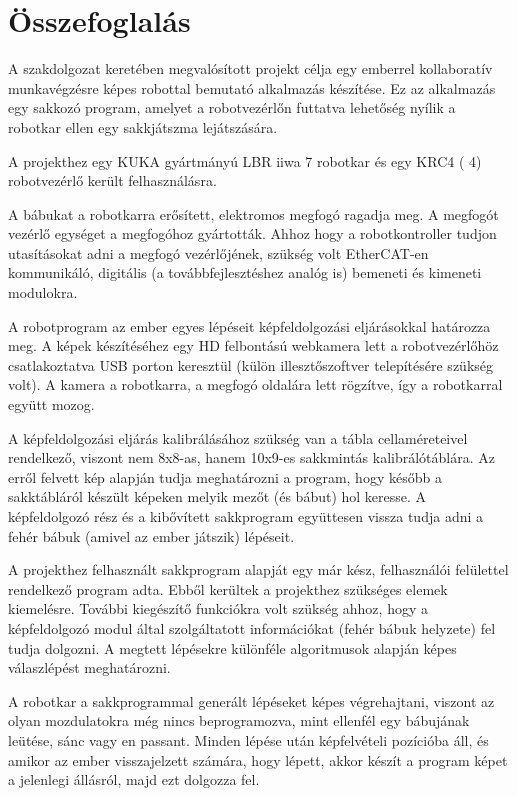 \documentclass[../documentation.tex]{subfiles}
\begin{document}
\section{Összefoglalás} \label{sec:osszefoglalas}
A szakdolgozat keretében megvalósított projekt célja egy emberrel kollaboratív munkavégzésre képes robottal bemutató alkalmazás készítése. Ez az alkalmazás egy sakkozó program, amelyet a robotvezérlőn futtatva lehetőség nyílik a robotkar ellen egy sakkjátszma lejátszására.

A projekthez egy KUKA gyártmányú LBR iiwa 7 robotkar és egy KRC4 ( 4) robotvezérlő került felhasználásra.

A bábukat a robotkarra erősített, elektromos megfogó\cite{grippermanual} ragadja meg. A megfogót vezérlő egységet a megfogóhoz gyártották\cite{grippermanual}. Ahhoz hogy a robotkontroller tudjon utasításokat adni a megfogó vezérlőjének, szükség volt EtherCAT-en kommunikáló, digitális (a továbbfejlesztéshez analóg is) bemeneti és kimeneti modulokra.

A robotprogram az ember egyes lépéseit képfeldolgozási eljárásokkal határozza meg. A képek készítéséhez egy HD felbontású webkamera lett a robotvezérlőhöz csatlakoztatva USB porton keresztül (külön illesztőszoftver  telepítésére szükség volt). A kamera a robotkarra, a megfogó oldalára lett rögzítve, így a robotkarral együtt mozog.

A képfeldolgozási eljárás kalibrálásához szükség van a tábla cellaméreteivel rendelkező, viszont nem 8x8-as, hanem 10x9-es sakkmintás kalibrálótáblára. Az erről felvett kép alapján tudja meghatározni a program, hogy később a sakktábláról készült képeken melyik mezőt (és bábut) hol keresse. A képfeldolgozó rész és a kibővített sakkprogram együttesen vissza tudja adni a fehér bábuk (amivel az ember játszik) lépéseit.

A projekthez felhasznált sakkprogram alapját egy már kész, felhasználói felülettel rendelkező program adta. Ebből kerültek a projekthez szükséges elemek kiemelésre. További kiegészítő funkciókra volt szükség ahhoz, hogy a képfeldolgozó modul által szolgáltatott információkat (fehér bábuk helyzete) fel tudja dolgozni. A megtett lépésekre különféle algoritmusok alapján képes válaszlépést meghatározni.

A robotkar a sakkprogrammal generált lépéseket képes végrehajtani, viszont az olyan mozdulatokra még nincs beprogramozva, mint ellenfél egy bábujának leütése, sánc vagy en passant. Minden lépése után képfelvételi pozícióba áll, és amikor az ember visszajelzett számára, hogy lépett, akkor készít a program képet a jelenlegi állásról, majd ezt dolgozza fel.
\end{document}
